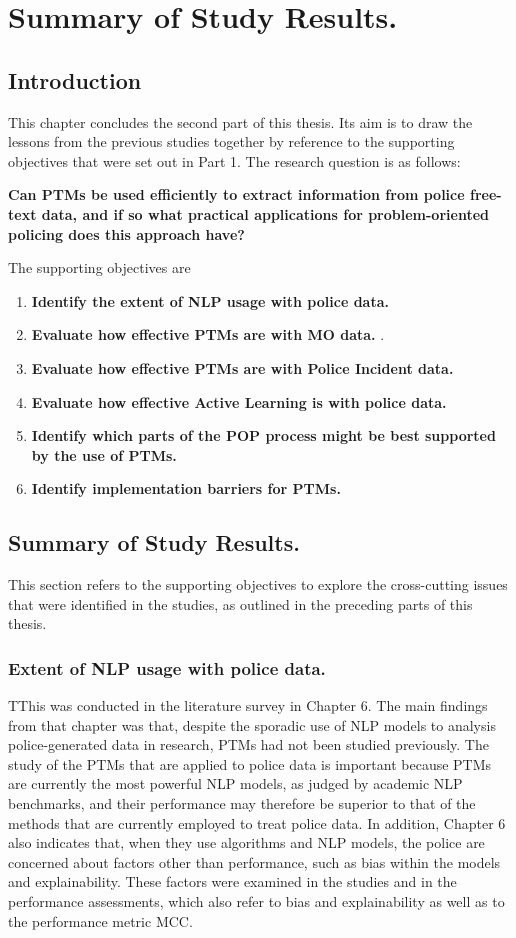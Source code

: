 \chapter{Summary of Study Results.}


\section{Introduction} This chapter concludes the second part of this thesis. Its aim is to draw the lessons from the previous studies together by reference to the supporting objectives that were set out in Part 1. The research question is as follows:


\textbf{Can PTMs be used efficiently to extract information from police free-text data, and if so what practical applications for problem-oriented policing does this approach have?}

The supporting objectives are

\begin{enumerate}
\item {\bf Identify the extent of NLP usage with police data.} 
\item {\bf Evaluate how effective PTMs are with MO data.} .
\item {\bf Evaluate how effective PTMs are with Police Incident data.} 
\item {\bf Evaluate how effective Active Learning is with police data.}  
\item {\bf Identify which parts of the POP process might be best supported by the use of PTMs.} 
\item {\bf Identify implementation barriers for PTMs.} 
\end{enumerate}

\section{Summary of Study Results.} This section refers to the supporting objectives to explore the cross-cutting issues that were identified in the studies, as outlined in the preceding parts of this thesis.

\subsection{Extent of NLP usage with police data.} TThis was conducted in the literature survey in Chapter 6. The main findings from that chapter was that, despite the sporadic use of NLP models to analysis police-generated data in research, PTMs had not been studied previously. The study of the PTMs that are applied to police data is important because PTMs are currently the most powerful NLP models, as judged by academic NLP benchmarks, and their performance may therefore be superior to that of the methods that are currently employed to treat police data. In addition, Chapter 6 also indicates that, when they use algorithms and NLP models, the police are concerned about factors other than performance, such as bias within the models and explainability. These factors were examined in the studies and in the performance assessments, which also refer to bias and explainability as well as to the performance metric MCC.

